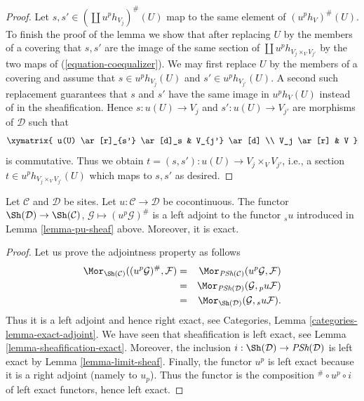 \begin{proof}
\medskip\noindent
Let $s, s' \in (\coprod u^ph_{V_j})^\#(U)$ map to the same element
of $(u^ph_V)^\#(U)$. To finish the proof of the lemma we show that
after replacing $U$ by the members of a covering that $s, s'$ are
the image of the same section of $\coprod u^p h_{V_j \times_V V_{j'}}$
by the two maps of (\ref{equation-coequalizer}). We may first replace $U$
by the members of a covering and assume that $s \in u^ph_{V_j}(U)$
and $s' \in u^ph_{V_{j'}}(U)$. A second such replacement guarantees
that $s$ and $s'$ have the same image in $u^ph_V(U)$ instead of in
the sheafification. Hence $s : u(U) \to V_j$ and $s' : u(U) \to V_{j'}$
are morphisms of $\mathcal{D}$ such that
$$
\xymatrix{
u(U) \ar[r]_{s'} \ar[d]_s & V_{j'} \ar[d] \\
V_j \ar[r] & V
}
$$
is commutative. Thus we obtain $t = (s, s') : u(U) \to V_j \times_V V_{j'}$,
i.e., a section $t \in u^ph_{V_j \times_V V_{j'}}(U)$
which maps to $s, s'$ as desired.
\end{proof}

\begin{lemma}
\label{lemma-exact-cocontinuous}
Let $\mathcal{C}$ and $\mathcal{D}$ be sites.
Let $u : \mathcal{C} \to \mathcal{D}$ be cocontinuous.
The functor
$\Sh(\mathcal{D}) \to \Sh(\mathcal{C})$,
$\mathcal{G} \mapsto (u^p\mathcal{G})^\#$
is a left adjoint to the functor ${}_su$ introduced
in Lemma \ref{lemma-pu-sheaf} above. Moreover, it
is exact.
\end{lemma}

\begin{proof}
Let us prove the adjointness property as follows
\begin{eqnarray*}
\Mor_{\Sh(\mathcal{C})}
((u^p\mathcal{G})^\#, \mathcal{F})
& = &
\Mor_{\textit{PSh}(\mathcal{C})}
(u^p\mathcal{G}, \mathcal{F}) \\
& = &
\Mor_{\textit{PSh}(\mathcal{D})}
(\mathcal{G}, {}_pu\mathcal{F}) \\
& = &
\Mor_{\Sh(\mathcal{D})}
(\mathcal{G}, {}_su\mathcal{F}).
\end{eqnarray*}
Thus it is a left adjoint and hence right exact,
see Categories, Lemma \ref{categories-lemma-exact-adjoint}.
We have seen that sheafification is left exact,
see Lemma \ref{lemma-sheafification-exact}.
Moreover, the inclusion
$i : \Sh(\mathcal{D}) \to \textit{PSh}(\mathcal{D})$
is left exact by Lemma \ref{lemma-limit-sheaf}. Finally, the functor
$u^p$ is left exact because it is a right adjoint
(namely to $u_p$). Thus the functor is the composition
${}^\# \circ u^p \circ i$ of left exact functors,
hence left exact.
\end{proof}

